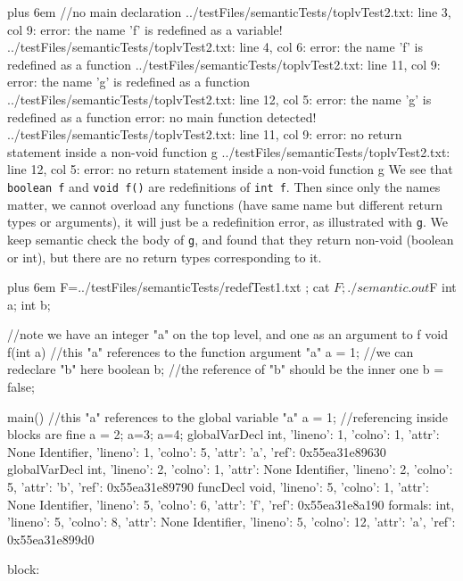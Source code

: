 \documentclass{article}
\makeatletter
\newenvironment{myverb}
 {\def\@xobeysp{\ }\verbatim\rightskip=0pt plus 6em\relax}
 {\endverbatim}
\makeatother
\begin{document}
\begin{itemize}
\begin{myverb}
//no main declaration
../testFiles/semanticTests/toplvTest2.txt: line 3, col 9: error: the name 'f' is redefined as a variable!
../testFiles/semanticTests/toplvTest2.txt: line 4, col 6: error: the name 'f' is redefined as a function
../testFiles/semanticTests/toplvTest2.txt: line 11, col 9: error: the name 'g' is redefined as a function
../testFiles/semanticTests/toplvTest2.txt: line 12, col 5: error: the name 'g' is redefined as a function
error: no main function detected!
../testFiles/semanticTests/toplvTest2.txt: line 11, col 9: error: no return statement inside a non-void function g
../testFiles/semanticTests/toplvTest2.txt: line 12, col 5: error: no return statement inside a non-void function g
\end{myverb}
We see that \verb|boolean f| and \verb|void f()| are redefinitions of \verb|int f|. Then since only the names matter, we cannot overload any functions (have same name but different return types or arguments), it will just be a redefinition error, as illustrated with \verb|g|. We keep semantic check the body of \verb|g|, and found that they return non-void (boolean or int), but there are no return types corresponding to it.


\begin{myverb}
F=../testFiles/semanticTests/redefTest1.txt ; cat $F; ./semantic.out $F
int a;
int b;

//note we have an integer "a" on the top level, and one as an argument to f
void f(int a){
    //this "a" references to the function argument "a"
    a = 1;
    //we can redeclare "b" here
    boolean b;
    //the reference of "b" should be the inner one
    b = false;
}

main(){
    //this "a" references to the global variable "a"
    a = 1;
    {
        //referencing inside blocks are fine
        a = 2;
        {
            {
                a=3;
            }
            {
                a=4;
            }
        }
    }
}
globalVarDecl
  int, {'lineno': 1, 'colno': 1, 'attr': None}
  Identifier, {'lineno': 1, 'colno': 5, 'attr': 'a', 'ref': 0x55ea31e89630}
globalVarDecl
  int, {'lineno': 2, 'colno': 1, 'attr': None}
  Identifier, {'lineno': 2, 'colno': 5, 'attr': 'b', 'ref': 0x55ea31e89790}
funcDecl
    void, {'lineno': 5, 'colno': 1, 'attr': None}
    Identifier, {'lineno': 5, 'colno': 6, 'attr': 'f', 'ref': 0x55ea31e8a190}
      formals:
        int, {'lineno': 5, 'colno': 8, 'attr': None}
        Identifier, {'lineno': 5, 'colno': 12, 'attr': 'a', 'ref': 0x55ea31e899d0}

    block:


\end{myverb}
\end{itemize}
\end{document}
